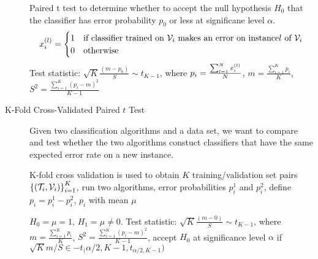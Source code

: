 \begin{description}
        Paired t test to determine whether to accept the null hypothesis $H_0$
        that the classifier has error probability $p_0$ or less at significane
        level $\alpha$.
        \[
            x^{(l)}_i = \begin{cases} 1 & \mbox{if classifier trained on }\mathcal{V}_i \mbox{
                makes an error on instance} l\mbox{ of } \mathcal{V}_i\\
                0 & \mbox{otherwise}
            \end{cases}
            \]
            Test statistic: $\sqrt{K}\frac{(m-p_0)}{S} \sim t_{K-1}$, where $p_i
            = \frac{\sum_{l=1}^N x^{(l)}_i}{N}$, $m=\frac{\sum_{i=1}^Kp_i}{K}$, $S^2 =
            \frac{\sum_{i=1}^K(p_i-m)^2}{K-1}$
    \item[K-Fold Cross-Validated Paired $t$ Test] Given two classification
        algorithms and a data set, we want to compare and test whether the two
        algorithms constuct classifiers that have the same expected error rate
        on a new instance.

        K-fold cross validation is used to obtain $K$ training/validation set
        pairs $\left\{ (\mathcal{T}_i, \mathcal{V}_i) \right\}^K_{i=1}$, run two algorithms,
        error probabilities $p_i^1$ and $p_i^2$, define $p_i = p_i^1 - p_i^2$,
        $p_i$ with mean $\mu$

        $H_0 = \mu = 1$, $H_1 = \mu\neq 0$. Test statistic:
        $\sqrt{K}\frac{(m-0)}{S} \sim t_{K-1}$, where $m = \frac{\sum_{i=1}^K
    p_i}{K}$, $S^2 = \frac{\sum_{i=1}^K(p_i - m)^2}{K-1}$, accept $H_0$ at
    significance level $\alpha$ if $\sqrt{K}m/S \in{-t_(\alpha/2, K-1},
    t_{\alpha/2, K-1})$
\end{description}
